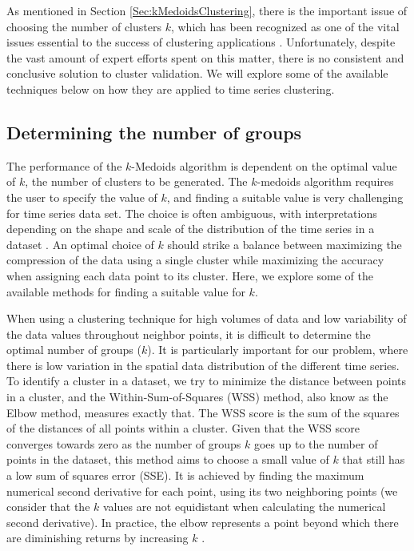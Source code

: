 As mentioned in Section \ref{Sec:kMedoidsClustering}, there is the important issue of choosing the number of clusters $k$, which has been recognized as one of the vital issues essential to the success of clustering applications \cite{Aggarwal2013}. Unfortunately, despite the vast amount of expert efforts spent on this matter, there is no consistent and conclusive solution to cluster validation. We will explore some of the available techniques below on how they are applied to time series clustering.

\subsection{Determining the number of groups}
\label{Sec:domain_number_groups}

The performance of the $k$-Medoids algorithm is dependent on the optimal value of $k$, the number of clusters to be generated. The $k$-medoids algorithm requires the user to specify the value of $k$, and finding a suitable value is very challenging for time series data set. The choice is often ambiguous, with interpretations depending on the shape and scale of the distribution of the time series in a dataset \cite{Liao2005}. An optimal choice of $k$ should strike a balance between maximizing the compression of the data using a single cluster while maximizing the accuracy when assigning each data point to its cluster. Here, we explore some of the available methods for finding a suitable value for $k$.

When using a clustering technique for high volumes of data and low variability of the data values throughout neighbor points, it is difficult to determine the optimal number of groups ($k$). It is particularly important for our problem, where there is low variation in the spatial data distribution of the different time series. To identify a cluster in a dataset, we try to minimize the distance between points in a cluster, and the Within-Sum-of-Squares (WSS) method, also know as the Elbow method, measures exactly that. The WSS score is the sum of the squares of the distances of all points within a cluster. Given that the WSS score converges towards zero as the number of groups $k$ goes up to the number of points in the dataset, this method aims to choose a small value of $k$ that still has a low sum of squares error (SSE). It is achieved by finding the maximum numerical second derivative for each point, using its two neighboring points (we consider that the $k$ values are not equidistant when calculating the numerical second derivative). In practice, the elbow represents a point beyond which there are diminishing returns by increasing $k$ \cite{Han2011}.


